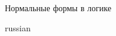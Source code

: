 \documentclass{article}
\begin{document}
\begin{center}
Нормальные формы в логике
\end{center}

\begin{otherlanguage*}{russian}


\end{otherlanguage*}
\end{document}
